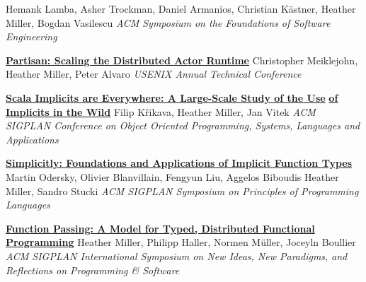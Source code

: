 \documentclass[9pt]{article}
\begin{document}
\vspace{-0.03in}
\newline{}
\newline\noindent Hemank Lamba, Asher Trockman, Daniel Armanios, Christian K\"{a}stner, \vspace{-0.03in}
\newline\noindent Heather Miller, Bogdan Vasilescu
\newline\noindent\emph{ACM Symposium on the Foundations of Software Engineering}
\bigskip

\noindent\href{https://www.usenix.org/system/files/atc19-meiklejohn.pdf}{\bf Partisan: Scaling the Distributed Actor Runtime}
\newline\noindent Christopher Meiklejohn, Heather Miller, Peter Alvaro
\newline\noindent\emph{USENIX Annual Technical Conference}
\bigskip

\noindent\href{https://arxiv.org/pdf/1908.07883}{\bf Scala Implicits are Everywhere: A Large-Scale Study of the Use}\vspace{-0.03in}
\newline\noindent\href{https://arxiv.org/pdf/1908.07883}{\bf of Implicits in the Wild}
\newline\noindent Filip K\v{r}ikava, Heather Miller, Jan Vitek
\newline\noindent\emph{ACM SIGPLAN Conference on Object Oriented Programming, Systems,}
\newline\noindent\emph{Languages and Applications}
\bigskip

\noindent\href{https://infoscience.epfl.ch/record/229878}{\bf Simplicitly: Foundations and Applications of Implicit Function Types}
\newline\noindent Martin Odersky, Olivier Blanvillain, Fengyun Liu, Aggelos Biboudis
\newline\noindent Heather Miller, Sandro Stucki
\newline\noindent\emph{ACM SIGPLAN Symposium on Principles of Programming Languages}
\bigskip

\noindent\href{https://infoscience.epfl.ch/record/205822}{\bf Function Passing: A Model for Typed, Distributed Functional}\vspace{-0.03in}
\newline\noindent\href{https://infoscience.epfl.ch/record/205822}{\bf Programming}
\newline\noindent Heather Miller, Philipp Haller, Normen M\"{u}ller, Joceyln Boullier
\newline\noindent\emph{ACM SIGPLAN International Symposium on New Ideas, New Paradigms,}
\newline\noindent\emph{and Reflections on Programming \& Software}
\bigskip
\end{document}
